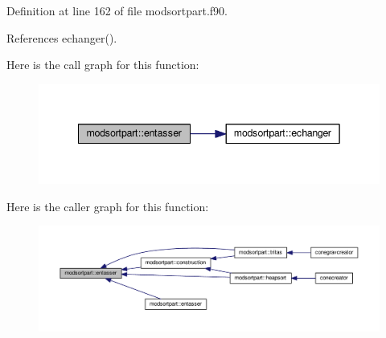 Definition at line 162 of file modsortpart.\+f90.



References echanger().



Here is the call graph for this function\+:\nopagebreak
\begin{figure}[H]
\begin{center}
\leavevmode
\includegraphics[width=342pt]{namespacemodsortpart_a237cc515810e4aa5203ebead3f59a3a7_cgraph}
\end{center}
\end{figure}




Here is the caller graph for this function\+:\nopagebreak
\begin{figure}[H]
\begin{center}
\leavevmode
\includegraphics[width=350pt]{namespacemodsortpart_a237cc515810e4aa5203ebead3f59a3a7_icgraph}
\end{center}
\end{figure}


